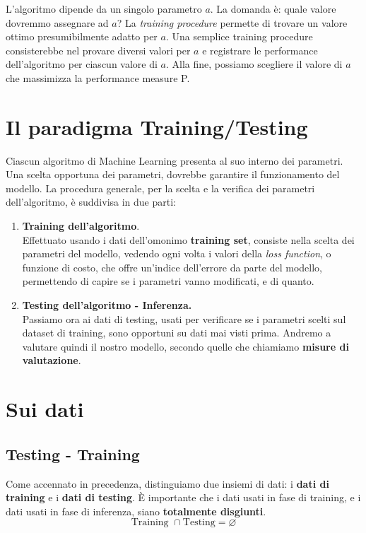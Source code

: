 \noindent
L'algoritmo dipende da un singolo parametro $a$. La domanda è: quale valore dovremmo assegnare ad $a$? La \emph{training procedure} permette di trovare un valore ottimo presumibilmente adatto per $a$.
\noindent
Una semplice training procedure consisterebbe nel provare diversi valori per $a$ e registrare le performance dell'algoritmo per ciascun valore di $a$. Alla fine, possiamo scegliere il valore di $a$ che massimizza la performance measure P.

\section{Il paradigma Training/Testing}
	Ciascun algoritmo di Machine Learning presenta al suo interno dei parametri. Una scelta opportuna dei parametri, dovrebbe garantire il funzionamento del modello. La procedura generale, per la scelta e la verifica dei parametri dell'algoritmo, è suddivisa in due parti:

\begin{enumerate}
	\item \textbf{Training dell'algoritmo}.\\
	Effettuato usando i dati dell'omonimo \textbf{training set}, consiste nella scelta dei parametri del modello, vedendo ogni volta i valori della \textit{loss function}, o funzione di costo, che offre un'indice dell'errore da parte del modello, permettendo di capire se i parametri vanno modificati, e di quanto.
	\item \textbf{Testing dell'algoritmo - Inferenza.}\\
	Passiamo ora ai dati di testing, usati per verificare se i parametri scelti sul dataset di training, sono opportuni su dati mai visti prima. Andremo a valutare quindi il nostro modello, secondo quelle che chiamiamo \textbf{misure di valutazione}.
\end{enumerate}

\newpage

\section{Sui dati}

\subsection{Testing - Training}
Come accennato in precedenza, distinguiamo due insiemi di dati: i \textbf{dati di training} e i \textbf{dati di testing}. È importante che i dati usati in fase di training, e i dati usati in fase di inferenza, siano \textbf{totalmente disgiunti}. 
$$
\text{Training }\cap \text{Testing} = \varnothing
$$

